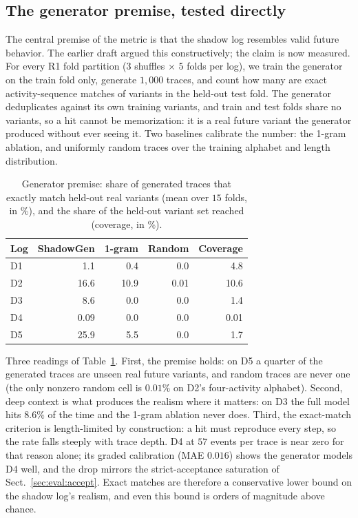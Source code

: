 \documentclass[runningheads]{llncs}
\begin{document}
{\color{chgblue}
\subsection{The generator premise, tested directly}
\label{sec:eval:genval}
The central premise of the metric is that the shadow log resembles valid future behavior. The earlier draft argued this constructively; the claim is now measured. For every R1 fold partition ($3$ shuffles $\times$ $5$ folds per log), we train the generator on the train fold only, generate $1{,}000$ traces, and count how many are exact activity-sequence matches of variants in the held-out test fold. The generator deduplicates against its own training variants, and train and test folds share no variants, so a hit cannot be memorization: it is a real future variant the generator produced without ever seeing it. Two baselines calibrate the number: the 1-gram ablation, and uniformly random traces over the training alphabet and length distribution.

\begin{table}[t]
\centering
\caption{Generator premise: share of generated traces that exactly match held-out real variants (mean over $15$ folds, in \%), and the share of the held-out variant set reached (coverage, in \%).}
\label{tab:genval}
\setlength{\tabcolsep}{5pt}
\footnotesize
\begin{tabular}{@{}lrrrr@{}}
\toprule
Log & ShadowGen & 1-gram & Random & Coverage \\
\midrule
D1 & 1.1 & 0.4 & 0.0 & 4.8 \\
D2 & 16.6 & 10.9 & 0.01 & 10.6 \\
D3 & 8.6 & 0.0 & 0.0 & 1.4 \\
D4 & 0.09 & 0.0 & 0.0 & 0.01 \\
D5 & 25.9 & 5.5 & 0.0 & 1.7 \\
\bottomrule
\end{tabular}
\end{table}

Three readings of Table~\ref{tab:genval}. First, the premise holds: on D5 a quarter of the generated traces are unseen real future variants, and random traces are never one (the only nonzero random cell is $0.01\%$ on D2's four-activity alphabet). Second, deep context is what produces the realism where it matters: on D3 the full model hits $8.6\%$ of the time and the 1-gram ablation never does. Third, the exact-match criterion is length-limited by construction: a hit must reproduce every step, so the rate falls steeply with trace depth. D4 at $57$ events per trace is near zero for that reason alone; its graded calibration (MAE $0.016$) shows the generator models D4 well, and the drop mirrors the strict-acceptance saturation of Sect.~\ref{sec:eval:accept}. Exact matches are therefore a conservative lower bound on the shadow log's realism, and even this bound is orders of magnitude above chance.
}
\end{document}
